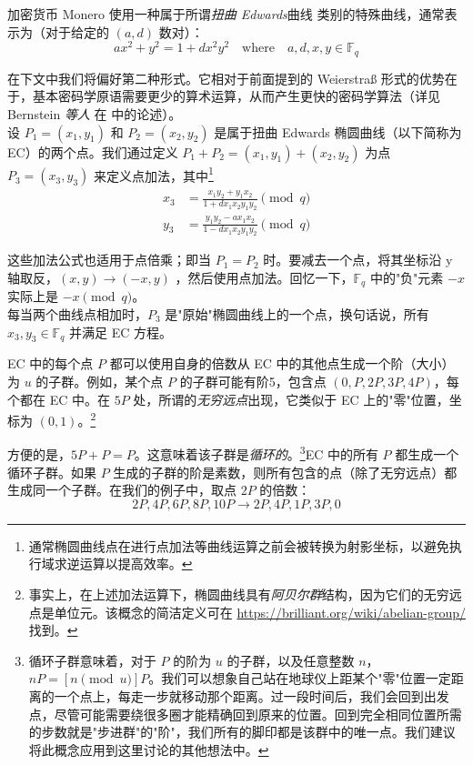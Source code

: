 加密货币 Monero 使用一种属于所谓{\em 扭曲 Edwards}曲线 \cite{Bernstein2008} 类别的特殊曲线，通常表示为（对于给定的 $(a,d)$ 数对）：\vspace{.175cm}
\[a x^2 + y^2 = 1 + d x^2 y^2 \quad \textrm{where} \quad a, d, x, y \in \mathbb{F}_q \]


在下文中我们将偏好第二种形式。它相对于前面提到的 Weierstraß 形式的优势在于，基本密码学原语需要更少的算术运算，从而产生更快的密码学算法（详见 Bernstein {\em 等人} 在 \cite{Bernstein2007} 中的论述）。\\

设 \(P_1 = (x_1, y_1)\) 和 \(P_2 = (x_2, y_2)\) 是属于扭曲 Edwards 椭圆曲线（以下简称为 EC）的两个点。我们通过定义 $P_1 + P_2 = (x_1, y_1) + (x_2, y_2)$ 为点 $P_3 = (x_3, y_3)$ 来定义点加法，其中\footnote{通常椭圆曲线点在进行点加法等曲线运算之前会被转换为射影坐标，以避免执行域求逆运算以提高效率。\cite{ecc-projective}}\vspace{.175cm}
\begin{align*}
x_3 & =  \frac{x_1 y_2 + y_1 x_ 2}{1 + d x_1 x_2 y_1 y_2}  \pmod{q} \\
y_3 & =  \frac{y_1 y_2 - a x_1 x_2}{1 - d x_1 x_2 y_1 y_2} \pmod{q} 
\end{align*}

这些加法公式也适用于点倍乘；即当 \(P_1 = P_2\) 时。要减去一个点，将其坐标沿 y 轴取反，$(x,y) \rightarrow (-x,y)$ \cite{Bernstein2008}，然后使用点加法。回忆一下，$\mathbb{F}_q$ 中的"负"元素 $-x$ 实际上是 $-x \pmod{q}$。
\\

每当两个曲线点相加时，$P_3$ 是"原始"椭圆曲线上的一个点，换句话说，所有 $x_3,y_3 \in \mathbb{F}_q$ 并满足 EC 方程。

EC 中的每个点 $P$ 都可以使用自身的倍数从 EC 中的其他点生成一个阶（大小）为 $u$ 的子群。例如，某个点 $P$ 的子群可能有阶5，包含点 $(0, P, 2P, 3P, 4P)$，每个都在 EC 中。在 $5P$ 处，所谓的{\em 无穷远点}出现，它类似于 EC 上的"零"位置，坐标为 $(0, 1)$。\footnote{事实上，在上述加法运算下，椭圆曲线具有{\em 阿贝尔群}结构，因为它们的无穷远点是单位元。该概念的简洁定义可在 \url{https://brilliant.org/wiki/abelian-group/} 找到。}

方便的是，$5P + P = P$。这意味着该子群是{\em 循环的}。\footnote{\label{cyclical_note}循环子群意味着，对于 $P$ 的阶为 $u$ 的子群，以及任意整数 $n$，$n P = [n \pmod{u}] P$。我们可以想象自己站在地球仪上距某个"零"位置一定距离的一个点上，每走一步就移动那个距离。过一段时间后，我们会回到出发点，尽管可能需要绕很多圈才能精确回到原来的位置。回到完全相同位置所需的步数就是"步进群"的"阶"，我们所有的脚印都是该群中的唯一点。我们建议将此概念应用到这里讨论的其他想法中。}EC 中的所有 $P$ 都生成一个循环子群。如果 $P$ 生成的子群的阶是素数，则所有包含的点（除了无穷远点）都生成同一个子群。在我们的例子中，取点 $2P$ 的倍数：\vspace{.175cm}
\[2P, 4P, 6P, 8P, 10P \rightarrow 2P, 4P, 1P, 3P, 0\]

